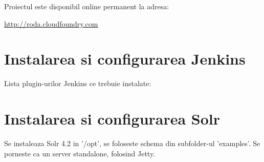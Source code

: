 Proiectul este disponibil online permanent la adresa:

\url{http://roda.cloudfoundry.com}

\section{Instalarea si configurarea Jenkins}

Lista plugin-urilor Jenkins ce trebuie instalate:

\section{Instalarea si configurarea Solr}

Se instaleaza Solr 4.2 in '/opt', se foloseste schema din subfolder-ul
'examples'. Se porneste ca un server standalone, folosind Jetty.
